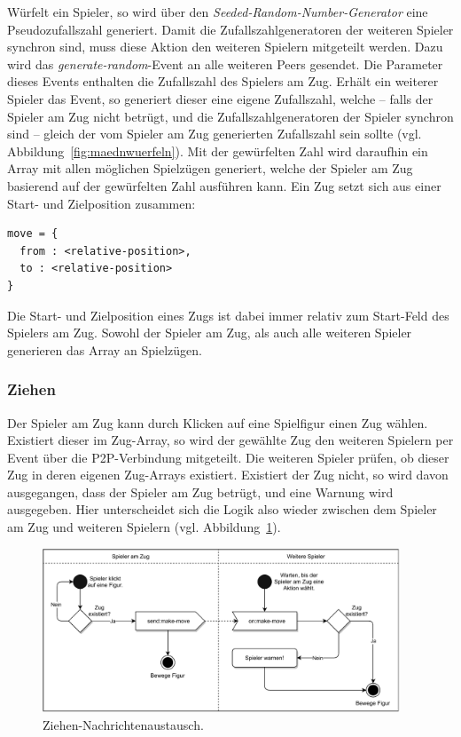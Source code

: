 Würfelt ein Spieler, so wird über den \textit{Seeded-Random-Number-Generator} eine Pseudozufallszahl generiert. Damit die Zufallszahlgeneratoren der weiteren Spieler synchron sind, muss diese Aktion den weiteren Spielern mitgeteilt werden. Dazu wird das \textit{generate-random}-Event an alle weiteren Peers gesendet. Die Parameter dieses Events enthalten die Zufallszahl des Spielers am Zug. Erhält ein weiterer Spieler das Event, so generiert dieser eine eigene Zufallszahl, welche -- falls der Spieler am Zug nicht betrügt, und die Zufallszahlgeneratoren der Spieler synchron sind -- gleich der vom Spieler am Zug generierten Zufallszahl sein sollte (vgl. Abbildung~\ref{fig:maednwuerfeln}). Mit der gewürfelten Zahl wird daraufhin ein Array mit allen möglichen Spielzügen generiert, welche der Spieler am Zug basierend auf der gewürfelten Zahl ausführen kann. Ein Zug setzt sich aus einer Start- und Zielposition zusammen:
\lstset{style=STYLE_COMMAND_LINE_ARGUMENT_SINGLE_LINE}
\begin{lstlisting}[belowskip=-0.8 \baselineskip]
move = {
  from : <relative-position>,
  to : <relative-position>
}
\end{lstlisting}

Die Start- und Zielposition eines Zugs ist dabei immer relativ zum Start-Feld des Spielers am Zug. Sowohl der Spieler am Zug, als auch alle weiteren Spieler generieren das Array an Spielzügen.\par

\subsubsection{Ziehen}
Der Spieler am Zug kann durch Klicken auf eine Spielfigur einen Zug wählen. Existiert dieser im Zug-Array, so wird der gewählte Zug den weiteren Spielern per Event über die \acs{P2P}-Verbindung mitgeteilt. Die weiteren Spieler prüfen, ob dieser Zug in deren eigenen Zug-Arrays existiert. Existiert der Zug nicht, so wird davon ausgegangen, dass der Spieler am Zug betrügt, und eine Warnung wird ausgegeben. Hier unterscheidet sich die Logik also wieder zwischen dem Spieler am Zug und weiteren Spielern (vgl. Abbildung~\ref{fig:maednziehen}).

\vspace{6pt}
\begin{figure}[h]
\centering
\includegraphics[width=0.95\textwidth]{bilder/PDF_SVG/MAEDN_ZIEHEN.pdf}
\caption{Ziehen-Nachrichtenaustausch.}
\label{fig:maednziehen}
\end{figure}

